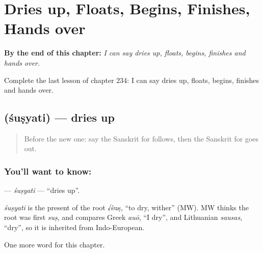 
\chapter{Dries up, Floats, Begins, Finishes, Hands over}
\label{ch:sa-dries-up-floats-begins-finishes-hands-over}

\begin{chapteropening}
\textbf{By the end of this chapter:} \emph{I can say dries up, floats, begins, finishes and hands over.}

Complete the last lesson of chapter 234: I can say dries up, floats, begins, finishes and hands over.
\end{chapteropening}

\section[\texorpdfstring{\sk{शुष्यति} (śuṣyati)}{शुष्यति (śuṣyati)}]{ (śuṣyati) — dries up}

\label{lesson:SA-C234-susyati}



\begin{quote}
Before the new one: say the Sanskrit for follows, then the Sanskrit for goes out.
\end{quote}

\subsection*{You'll want to know: }
\textbf{} — \emph{śuṣyati} — \textquotedblleft{}dries up\textquotedblright{}.

\begin{cousinweb}
\emph{śuṣyati} is the present of the root √śuṣ, \textquotedblleft{}to dry, wither\textquotedblright{} (MW). MW thinks the root was first \emph{suṣ}, and compares Greek \emph{auō}, \textquotedblleft{}I dry\textquotedblright{}, and Lithuanian \emph{sausas}, \textquotedblleft{}dry\textquotedblright{}, so it is inherited from Indo-European.
\end{cousinweb}

\begin{grammarlens}[title={What you've built}]
One more word for this chapter.
\end{grammarlens}

